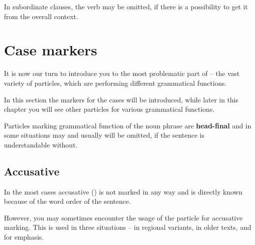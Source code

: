 


In subordinate clauses, the verb may be omitted, if there is a possibility to
get it from the overall context.

\section{Case markers}
\label{sec:cases}

It is now our turn to introduce you to the most problematic part of \andro --
the vast variety of particles, which are performing different grammatical
functions.

In this section the markers for the cases will be introduced, while later in
this chapter you will see other particles for various grammatical functions.

Particles marking grammatical function of the noun phrase are
\textbf{head-final} and in some situations may and usually will be omitted, if
the sentence is understandable without.

\subsection{Accusative}

In the most cases accusative (\Acc{}) is not marked in any way and is directly
known because of the word order of the sentence.


However, you may sometimes encounter the usage of the  particle for
accusative marking. This is used in three situations -- in regional variants, in
older texts, and for emphasis.

